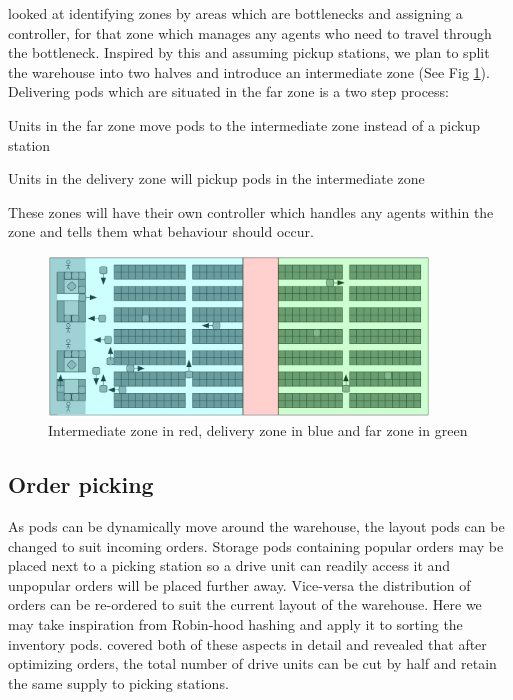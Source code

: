 \documentclass[a4paper,11pt]{article}
\begin{document}
\cite{wilt2014spatially} looked at identifying zones by areas which are bottlenecks and assigning a controller, for that zone which manages any agents who need to travel through the bottleneck. Inspired by this and assuming pickup stations, we plan to split the warehouse into two halves and introduce an intermediate zone (See Fig \ref{kivalayout2}). Delivering pods which are situated in the far zone is a two step process:
\begin{compactenum}
	\item Units in the far zone move pods to the intermediate zone instead of a pickup station
	\item Units in the delivery zone will pickup pods in the intermediate zone
\end{compactenum}
\noindent These zones will have their own controller which handles any agents within the zone and tells them what behaviour should occur.

\begin{figure}[h]
	\centering
	\includegraphics[width=0.9\textwidth]{kivasystemlayout_adjusted}
	\caption{Intermediate zone in red, delivery zone in blue and far zone in green}
	\label{kivalayout2}
\end{figure}

\subsection{Order picking}
As pods can be dynamically move around the warehouse, the layout pods can be changed to suit incoming orders. Storage pods containing popular orders may be placed next to a picking station so a drive unit can readily access it and unpopular orders will be placed further away. Vice-versa the distribution of orders can be re-ordered to suit the current layout of the warehouse. Here we may take inspiration from Robin-hood hashing and apply it to sorting the inventory pods. \cite{boysen2017parts} covered both of these aspects in detail and revealed that after optimizing orders, the total number of drive units can be cut by half and retain the same supply to picking stations.
\end{document}
